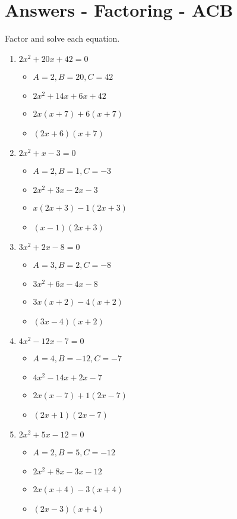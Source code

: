 \documentclass{article}
\begin{document}
\section{Answers - Factoring - ACB}
Factor and solve each equation. \\
\begin{enumerate}
\item $2x^{2} + 20x + 42 = 0$
  \begin{itemize}
  \item $A=2, B=20, C=42$
  \item $2x^{2}+14x+6x+42$
  \item $2x(x+7)+6(x+7)$
  \item $(2x+6)(x+7)$
  \end{itemize}
\item $2x^{2} + x - 3 = 0$
  \begin{itemize}
  \item $A=2, B=1, C=-3$
  \item $2x^{2}+3x-2x-3$
  \item $x(2x+3)-1(2x+3)$
  \item $(x-1)(2x+3)$
  \end{itemize}
\item $3x^{2} + 2x - 8 = 0$
  \begin{itemize}
  \item $A=3, B=2, C=-8$
  \item $3x^{2}+6x-4x-8$
  \item $3x(x+2)-4(x+2)$
  \item $(3x-4)(x+2)$
  \end{itemize}
\item $4x^{2} - 12x - 7 = 0$
  \begin{itemize}
  \item $A=4, B=-12, C=-7$
  \item $4x^{2}-14x+2x-7$
  \item $2x(x-7)+1(2x-7)$
  \item $(2x+1)(2x-7)$
  \end{itemize}
\item $2x^{2} + 5x - 12 = 0$
  \begin{itemize}
  \item $A=2, B=5, C=-12$
  \item $2x^{2}+8x-3x-12$
  \item $2x(x+4)-3(x+4)$
  \item $(2x-3)(x+4)$
  \end{itemize}

\end{enumerate}
\end{document}
